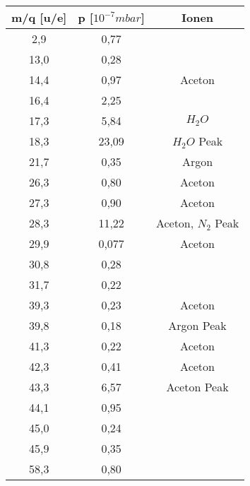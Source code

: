 \begin{center}
\begin{tabular}{c|c|c}
m/q [u/e] & p [$10^{-7} mbar$] & Ionen\\	
\hline	
2,9 &	0,77 &\\
13,0 &	0,28 &\\
14,4 &	0,97 & Aceton\\
16,4 &	2,25 &\\
17,3 &	5,84 & $H_2O$\\
18,3 &	23,09 & $H_2O$ Peak\\
21,7 &	0,35 & Argon\\
26,3 &	0,80 & Aceton\\
27,3 &	0,90 & Aceton\\
28,3 &	11,22 & Aceton, $N_2$ Peak\\
29,9 &	0,077 & Aceton\\
30,8 &	0,28 &\\
31,7 &	0,22 &\\
39,3 &	0,23 & Aceton\\
39,8 &	0,18 & Argon Peak\\
41,3 &	0,22 & Aceton\\
42,3 &	0,41 & Aceton\\
43,3 &	6,57 & Aceton Peak\\
44,1 &	0,95 &\\
45,0 &	0,24 &\\
45,9 &	0,35 &\\
58,3 &	0,80 &\\
\end{tabular}
\end{center}



